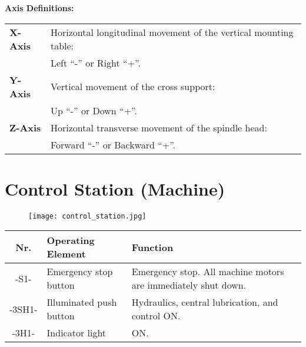 \vspace{0.5cm}

\noindent \textbf{Axis Definitions:}

\vspace{0.3cm}

\noindent \begin{tabular}{ l l }
\textbf{X-Axis} & Horizontal longitudinal movement of the vertical mounting table: \\
                & Left \enquote{-} or Right \enquote{+}. \\
\textbf{Y-Axis} & Vertical movement of the cross support: \\
                & Up \enquote{-} or Down \enquote{+}. \\
\textbf{Z-Axis} & Horizontal transverse movement of the spindle head: \\
                & Forward \enquote{-} or Backward \enquote{+}. \\
\end{tabular}

\section{Control Station (Machine)}

\begin{figure}[h]
    \centering
    \texttt{[image: control\_station.jpg]} %
\end{figure}


\vspace{0.3cm}

\noindent %
\begin{tabular}{|c|l|p{10cm}|}
    \hline\hline
    \textbf{Nr.} & \textbf{Operating Element} & \textbf{Function} \\
    \hline\hline
    -S1-   & Emergency stop button & Emergency stop. All machine motors are immediately shut down.\footnotemark[11] \\
    \hline
    -3SH1- & Illuminated push button & Hydraulics, central lubrication, and control ON. \\
    -3H1-  & Indicator light & ON. \\
    \hline\hline
\end{tabular}

\vspace{0.5cm}

